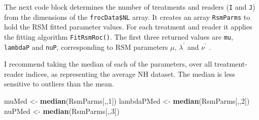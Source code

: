 \documentclass[
]{book}
\newenvironment{Shaded}{\begin{snugshade}}{\end{snugshade}}
\newcommand{\CommentTok}[1]{\textcolor[rgb]{0.56,0.35,0.01}{\textit{#1}}}
\newcommand{\ControlFlowTok}[1]{\textcolor[rgb]{0.13,0.29,0.53}{\textbf{#1}}}
\newcommand{\DataTypeTok}[1]{\textcolor[rgb]{0.13,0.29,0.53}{#1}}
\newcommand{\DecValTok}[1]{\textcolor[rgb]{0.00,0.00,0.81}{#1}}
\newcommand{\KeywordTok}[1]{\textcolor[rgb]{0.13,0.29,0.53}{\textbf{#1}}}
\newcommand{\NormalTok}[1]{#1}
\newcommand{\OperatorTok}[1]{\textcolor[rgb]{0.81,0.36,0.00}{\textbf{#1}}}
\newcommand{\StringTok}[1]{\textcolor[rgb]{0.31,0.60,0.02}{#1}}
\begin{document}
The next code block determines the number of treatments and readers (\texttt{I} and \texttt{J}) from the dimensions of the \texttt{frocData\$NL} array. It creates an array \texttt{RsmParms} to hold the RSM fitted parameter values. For each treatment and reader it applies the fitting algorithm \texttt{FitRsmRoc()}. The first three returned values are \texttt{mu}, \texttt{lambdaP} and \texttt{nuP}, corresponding to RSM parameters \({\mu}\), \({\lambda^{'}}\) and \({\nu^{'}}\) .

\begin{Shaded}
\end{Shaded}

I recommend taking the median of each of the parameters, over all treatment-reader indices, as representing the average NH dataset. The median is less sensitive to outliers than the mean.

\begin{Shaded}
\begin{Highlighting}[]
\NormalTok{muMed \textless{}{-}}\StringTok{ }\KeywordTok{median}\NormalTok{(RsmParms[,,}\DecValTok{1}\NormalTok{]) }
\NormalTok{lambdaPMed \textless{}{-}}\StringTok{ }\KeywordTok{median}\NormalTok{(RsmParms[,,}\DecValTok{2}\NormalTok{])}
\NormalTok{nuPMed \textless{}{-}}\StringTok{ }\KeywordTok{median}\NormalTok{(RsmParms[,,}\DecValTok{3}\NormalTok{])}
\end{Highlighting}
\end{Shaded}
\end{document}
